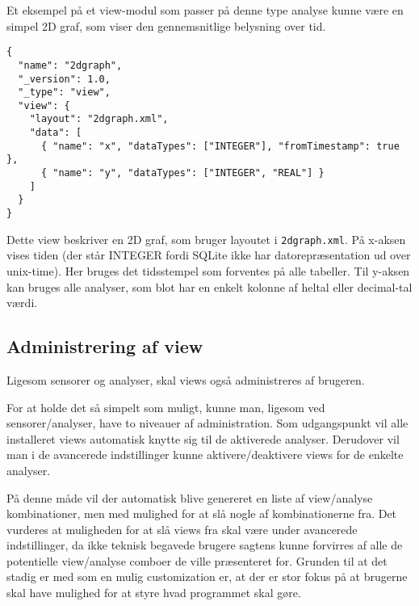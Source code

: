 Et eksempel på et view-modul som passer på denne type analyse kunne være en simpel 2D graf, som viser den gennemsnitlige belysning over tid.

\begin{lstlisting}
{
  "name": "2dgraph",
  "_version": 1.0,
  "_type": "view",
  "view": {
    "layout": "2dgraph.xml",
    "data": [
      { "name": "x", "dataTypes": ["INTEGER"], "fromTimestamp": true },
      { "name": "y", "dataTypes": ["INTEGER", "REAL"] }
    ]
  }
}
\end{lstlisting}

Dette view beskriver en 2D graf, som bruger layoutet i \texttt{2dgraph.xml}.
På x-aksen vises tiden (der står INTEGER fordi SQLite ikke har datorepræsentation ud over unix-time).
Her bruges det tidsstempel som forventes på alle tabeller.
Til y-aksen kan bruges alle analyser, som blot har en enkelt kolonne af heltal eller decimal-tal værdi.

\subsection{Administrering af view}
Ligesom sensorer og analyser, skal views også administreres af brugeren.

For at holde det så simpelt som muligt, kunne man, ligesom ved sensorer/analyser, have to niveauer af administration.
Som udgangspunkt vil alle installeret views automatisk knytte sig til de aktiverede analyser.
Derudover vil man i de avancerede indstillinger kunne aktivere/deaktivere views for de enkelte analyser.

På denne måde vil der automatisk blive genereret en liste af view/analyse kombinationer, men med mulighed for at slå nogle af kombinationerne fra.
Det vurderes at muligheden for at slå views fra skal være under avancerede indstillinger, da ikke teknisk begavede brugere sagtens kunne forvirres af alle de potentielle view/analyse comboer de ville præsenteret for.
Grunden til at det stadig er med som en mulig customization er, at der er stor fokus på at brugerne skal have mulighed for at styre hvad programmet skal gøre. 
